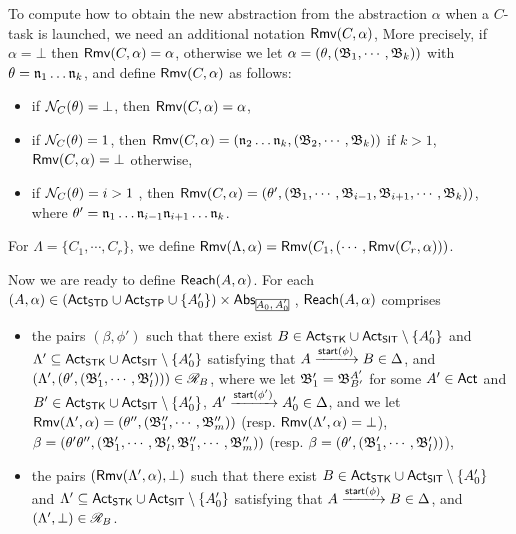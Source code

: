 To compute how to obtain the new abstraction from the abstraction $\alpha$ when a $C$-task is launched, we need an additional notation $\mathsf{Rmv}(C,\alpha)$,
More precisely, if $\alpha = \bot$ then $\mathsf{Rmv}(C,\alpha) = \alpha$, otherwise we let $\alpha = (\theta, ({\mathfrak{B} }_1,\cdots, {\mathfrak{B} }_k))$ with $\theta = \mathfrak{n}_1\dots\mathfrak{n}_k$, and define $\mathsf{Rmv}(C,\alpha)$ as follows:
\begin{itemize}
    \item if $\mathcal{N}_C(\theta) = \bot$, then $\mathsf{Rmv}(C,\alpha) = \alpha$,
    \item if $\mathcal{N}_C(\theta) = 1$, then $\mathsf{Rmv}(C,\alpha) = (\mathfrak{n}_2\dots\mathfrak{n}_k,({\mathfrak{B} }_2,\cdots,{\mathfrak{B} }_k))$ if $k>1$, $\mathsf{Rmv}(C,\alpha) = \bot$ otherwise,
    \item if $\mathcal{N}_C(\theta) = i > 1$ , then $\mathsf{Rmv}(C,\alpha) = (\theta',({\mathfrak{B} }_1,\cdots,{\mathfrak{B} }_{i-1},{\mathfrak{B} }_{i+1},\cdots,{\mathfrak{B} }_{k}))$, where $\theta' = \mathfrak{n}_1\dots\mathfrak{n}_{i-1}\mathfrak{n}_{i+1}\dots\mathfrak{n}_k$.
\end{itemize}
For $\Lambda = \{C_1,\cdots,C_r\}$, we define $\mathsf{Rmv}(\Lambda,\alpha) = \mathsf{Rmv}(C_1,(\cdots,\mathsf{Rmv}(C_r,\alpha)))$.

Now we are ready to define ${\sf Reach}(A,\alpha)$. For each $(A,\alpha) \in (\act_{\STD}\cup\act_{\STP}\cup\{A_0'\})\times\abs_{\mhcancel{A_0,A_0'}}$, ${\sf Reach}(A,\alpha)$ comprises
 \begin{itemize}
     \item the pairs $(\beta, \phi')$ such that there exist $B\in{\sf Act}_{\mathsf{STK}}\cup{\sf Act}_{\mathsf{SIT}}\setminus\{A_0'\}$ and $\Lambda'\subseteq{\sf Act}_{\mathsf{STK}}\cup{\sf Act}_{\mathsf{SIT}}\setminus\{A_0'\}$ satisfying that $A\xrightarrow{{\mathsf{start} }(\phi)}B\in\Delta$, and $(\Lambda',(\theta',({\mathfrak{B} }_1',\cdots,{\mathfrak{B} }_l')))\in\mathscr{R}_{B}$, where
     we let ${\mathfrak{B} }_1' = {\mathfrak{B} }_{B'}^{A'}$ for some $A'\in{\sf Act}$ and $B'\in{\sf Act}_{\mathsf{STK}}\cup{\sf Act}_{\mathsf{SIT}}\setminus\{A_0'\}$, $A'\xrightarrow{{\mathsf{start} }(\phi')}A_0'\in\Delta$, and we let $\mathsf{Rmv}(\Lambda',\alpha) = (\theta'',({\mathfrak{B} }_1'',\cdots,{\mathfrak{B} }_m''))$ (resp. $\mathsf{Rmv}(\Lambda',\alpha) = \bot$), $\beta = (\theta'\theta'',({\mathfrak{B} }_1',\cdots,{\mathfrak{B} }_l',{\mathfrak{B} }_1'',\cdots,{\mathfrak{B} }_m''))$ (resp. $\beta = (\theta',({\mathfrak{B} }_1',\cdots,{\mathfrak{B} }_l'))$),
%
    \item the pairs $(\mathsf{Rmv}(\Lambda',\alpha), \bot)$ such that there exist $B\in{\sf Act}_{\mathsf{STK}}\cup{\sf Act}_{\mathsf{SIT}}\setminus\{A_0'\}$ and $\Lambda'\subseteq{\sf Act}_{\mathsf{STK}}\cup{\sf Act}_{\mathsf{SIT}}\setminus\{A_0'\}$ satisfying that $A\xrightarrow{{\mathsf{start} }(\phi)}B\in\Delta$, and $(\Lambda',\bot)\in\mathscr{R}_{B}$.
     
 \end{itemize}

